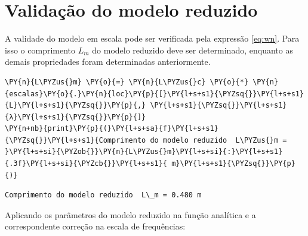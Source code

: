     \hypertarget{validauxe7uxe3o-do-modelo-reduzido}{%
\section{Validação do modelo
reduzido}\label{validauxe7uxe3o-do-modelo-reduzido}}

A validade do modelo em escala pode ser verificada pela expressão
\ref{eq:wn}. Para isso o comprimento \(L_m\) do modelo reduzido deve ser
determinado, enquanto as demais propriedades foram determinadas
anteriormente.

    \begin{tcolorbox}[breakable, size=fbox, boxrule=1pt, pad at break*=1mm,colback=cellbackground, colframe=cellborder]
\begin{Verbatim}[commandchars=\\\{\}]
\PY{n}{L\PYZus{}m} \PY{o}{=} \PY{n}{L\PYZus{}c} \PY{o}{*} \PY{n}{escalas}\PY{o}{.}\PY{n}{loc}\PY{p}{[}\PY{l+s+s1}{\PYZsq{}}\PY{l+s+s1}{L}\PY{l+s+s1}{\PYZsq{}}\PY{p}{,} \PY{l+s+s1}{\PYZsq{}}\PY{l+s+s1}{λ}\PY{l+s+s1}{\PYZsq{}}\PY{p}{]}
\PY{n+nb}{print}\PY{p}{(}\PY{l+s+sa}{f}\PY{l+s+s1}{\PYZsq{}}\PY{l+s+s1}{Comprimento do modelo reduzido  L\PYZus{}m = }\PY{l+s+si}{\PYZob{}}\PY{n}{L\PYZus{}m}\PY{l+s+si}{:}\PY{l+s+s1}{.3f}\PY{l+s+si}{\PYZcb{}}\PY{l+s+s1}{ m}\PY{l+s+s1}{\PYZsq{}}\PY{p}{)}
\end{Verbatim}
\end{tcolorbox}

    \begin{Verbatim}[commandchars=\\\{\}]
Comprimento do modelo reduzido  L\_m = 0.480 m
    \end{Verbatim}

    Aplicando os parâmetros do modelo reduzido na função analítica e a
correspondente correção na escala de frequências:

